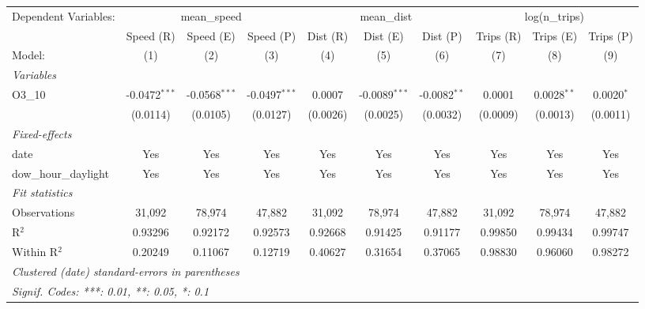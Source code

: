 \begingroup
\centering
\begin{tabular}{lccccccccc}
   \tabularnewline \midrule \midrule
   Dependent Variables: & \multicolumn{3}{c}{mean\_speed} & \multicolumn{3}{c}{mean\_dist} & \multicolumn{3}{c}{log(n\_trips)}\\
                         & Speed (R)       & Speed (E)       & Speed (P)       & Dist (R) & Dist (E)        & Dist (P)       & Trips (R) & Trips (E)     & Trips (P) \\   
   Model:                & (1)             & (2)             & (3)             & (4)      & (5)             & (6)            & (7)       & (8)           & (9)\\  
   \midrule
   \emph{Variables}\\
   O3\_10                & -0.0472$^{***}$ & -0.0568$^{***}$ & -0.0497$^{***}$ & 0.0007   & -0.0089$^{***}$ & -0.0082$^{**}$ & 0.0001    & 0.0028$^{**}$ & 0.0020$^{*}$\\   
                         & (0.0114)        & (0.0105)        & (0.0127)        & (0.0026) & (0.0025)        & (0.0032)       & (0.0009)  & (0.0013)      & (0.0011)\\   
   \midrule
   \emph{Fixed-effects}\\
   date                  & Yes             & Yes             & Yes             & Yes      & Yes             & Yes            & Yes       & Yes           & Yes\\  
   dow\_hour\_daylight   & Yes             & Yes             & Yes             & Yes      & Yes             & Yes            & Yes       & Yes           & Yes\\  
   \midrule
   \emph{Fit statistics}\\
   Observations          & 31,092          & 78,974          & 47,882          & 31,092   & 78,974          & 47,882         & 31,092    & 78,974        & 47,882\\  
   R$^2$                 & 0.93296         & 0.92172         & 0.92573         & 0.92668  & 0.91425         & 0.91177        & 0.99850   & 0.99434       & 0.99747\\  
   Within R$^2$          & 0.20249         & 0.11067         & 0.12719         & 0.40627  & 0.31654         & 0.37065        & 0.98830   & 0.96060       & 0.98272\\  
   \midrule \midrule
   \multicolumn{10}{l}{\emph{Clustered (date) standard-errors in parentheses}}\\
   \multicolumn{10}{l}{\emph{Signif. Codes: ***: 0.01, **: 0.05, *: 0.1}}\\
\end{tabular}
\par\endgroup
